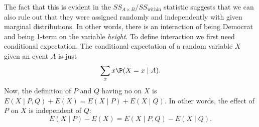 The fact that this is evident in the $SS_{A\times B}/SS_{\text{within}}$ statistic suggests that we can also rule out that they were assigned randomly and independently with given marginal distributions. In other words, there is an interaction of being Democrat and being 1-term on the variable \emph{height}. %
To define interaction we first need conditional expectation.
The conditional expectation of a random variable $X$ given an event $A$ is just
\[
	\sum_x x \P(X=x\mid A).
\]
Now, the definition of $P$ and $Q$ having no  on $X$ is $E(X\mid P,Q)+E(X)= E(X\mid P)+E(X\mid Q)$. In other words, the effect of $P$ on $X$ is independent of $Q$:
\[
	E(X\mid P)-E(X) = E(X\mid P,Q)-E(X\mid Q).
\]


